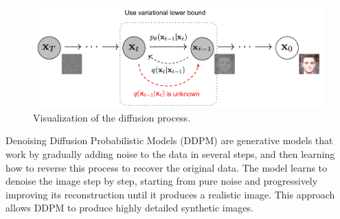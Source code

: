 


\begin{figure}[h]
    \centering
    \includegraphics[width=0.9\linewidth]{concept_engineering/ddpm/DDPM.png}
    \caption{Visualization of the diffusion process\cite{ho2020denoisingdiffusionprobabilisticmodels}.}
    \label{fig:diffusion-process}
\end{figure}
Denoising Diffusion Probabilistic Models (DDPM)\cite{ho2020denoisingdiffusionprobabilisticmodels} are generative models that work by gradually adding noise to the data in several steps, and then learning how to reverse this process to recover the original data. The model learns to denoise the image step by step, starting from pure noise and progressively improving its reconstruction until it produces a realistic image. This approach allows DDPM to produce highly detailed synthetic images. 


